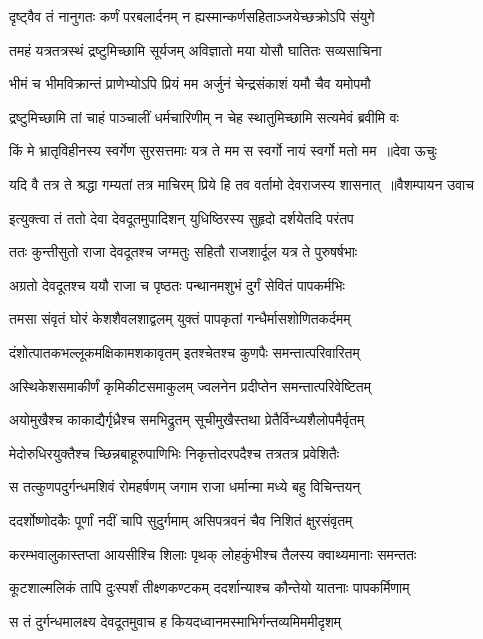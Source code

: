 \twolineshloka
{दृष्ट्वैव तं नानुगतः कर्णं परबलार्दनम्}
{न ह्यस्मान्कर्णसहिताञ्जयेच्छक्रोऽपि संयुगे}


\twolineshloka
{तमहं यत्रतत्रस्थं द्रष्टुमिच्छामि सूर्यजम्}
{अविज्ञातो मया योसौ घातितः सव्यसाचिना}


\twolineshloka
{भीमं च भीमविक्रान्तं प्राणेभ्योऽपि प्रियं मम}
{अर्जुनं चेन्द्रसंकाशं यमौ चैव यमोपमौ}


\twolineshloka
{द्रष्टुमिच्छामि तां चाहं पाञ्चालीं धर्मचारिणीम्}
{न चेह स्थातुमिच्छामि सत्यमेवं ब्रवीमि वः}


\threelineshloka
{किं मे भ्रातृविहीनस्य स्वर्गेण सुरसत्तमाः}
{यत्र ते मम स स्वर्गो नायं स्वर्गो मतो मम ॥देवा ऊचुः}
{}


\threelineshloka
{यदि वै तत्र ते श्रद्धा गम्यतां तत्र माचिरम्}
{प्रिये हि तव वर्तामो देवराजस्य शासनात् ॥वैशम्पायन उवाच}
{}


\twolineshloka
{इत्युक्त्वा तं ततो देवा देवदूतमुपादिशन्}
{युधिष्ठिरस्य सुहृदो दर्शयेतदि परंतप}


\twolineshloka
{ततः कुन्तीसुतो राजा देवदूतश्च जग्मतुः}
{सहितौ राजशार्दूल यत्र ते पुरुषर्षभाः}


\twolineshloka
{अग्रतो देवदूतश्च ययौ राजा च पृष्ठतः}
{पन्थानमशुभं दुर्गं सेवितं पापकर्मभिः}


\twolineshloka
{तमसा संवृतं घोरं केशशैवलशाद्वलम्}
{युक्तं पापकृतां गन्धैर्मासशोणितकर्दमम्}


\twolineshloka
{दंशोत्पातकभल्लूकमक्षिकामशकावृतम्}
{इतश्चेतश्च कुणपैः समन्तात्परिवारितम्}


\twolineshloka
{अस्थिकेशसमाकीर्णं कृमिकीटसमाकुलम्}
{ज्वलनेन प्रदीप्तेन समन्तात्परिवेष्टितम्}


\twolineshloka
{अयोमुखैश्च काकाद्यैर्गृध्रैश्च समभिद्रुतम्}
{सूचीमुखैस्तथा प्रेतैर्विन्ध्यशैलोपमैर्वृतम्}


\twolineshloka
{मेदोरुधिरयुक्तैश्च च्छिन्नबाहूरुपाणिभिः}
{निकृत्तोदरपदैश्च तत्रतत्र प्रवेशितैः}


\twolineshloka
{स तत्कुणपदुर्गन्धमशिवं रोमहर्षणम्}
{जगाम राजा धर्मान्मा मध्ये बहु विचिन्तयन्}


\twolineshloka
{ददर्शोष्णोदकैः पूर्णां नदीं चापि सुदुर्गमाम्}
{असिपत्रवनं चैव निशितं क्षुरसंवृतम्}


\twolineshloka
{करम्भवालुकास्तप्ता आयसीश्चि शिलाः पृथक्}
{लोहकुंभीश्च तैलस्य क्वाथ्यमानाः समन्ततः}


\twolineshloka
{कूटशाल्मलिकं तापि दुःस्पर्शं तीक्ष्णकण्टकम्}
{ददर्शान्याश्च कौन्तेयो यातनाः पापकर्मिणाम्}


\twolineshloka
{स तं दुर्गन्धमालक्ष्य देवदूतमुवाच ह}
{कियदध्वानमस्माभिर्गन्तव्यमिममीदृशम्}


